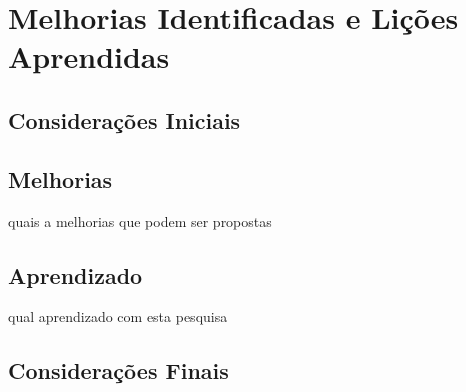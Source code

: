 \chapter{Melhorias Identificadas e Lições Aprendidas}
\label{sec:melhorias}
\pagestyle{plain}

\section{Considerações Iniciais}
\section{Melhorias}
quais a melhorias que podem ser propostas
\section{Aprendizado}
qual aprendizado com esta pesquisa
\section{Considerações Finais}